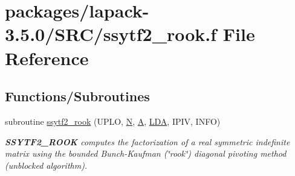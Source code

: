 \hypertarget{ssytf2__rook_8f}{}\section{packages/lapack-\/3.5.0/\+S\+R\+C/ssytf2\+\_\+rook.f File Reference}
\label{ssytf2__rook_8f}
\subsection*{Functions/\+Subroutines}
\begin{DoxyCompactItemize}
\item 
subroutine \hyperlink{group__realSYcomputational_ga366e10c15d6365d941b0b915c8411ccd}{ssytf2\+\_\+rook} (U\+P\+L\+O, \hyperlink{polmisc_8c_a0240ac851181b84ac374872dc5434ee4}{N}, \hyperlink{classA}{A}, \hyperlink{example__user_8c_ae946da542ce0db94dced19b2ecefd1aa}{L\+D\+A}, I\+P\+I\+V, I\+N\+F\+O)
\begin{DoxyCompactList}\small\item\em {\bfseries S\+S\+Y\+T\+F2\+\_\+\+R\+O\+O\+K} computes the factorization of a real symmetric indefinite matrix using the bounded Bunch-\/\+Kaufman (\char`\"{}rook\char`\"{}) diagonal pivoting method (unblocked algorithm). \end{DoxyCompactList}\end{DoxyCompactItemize}
